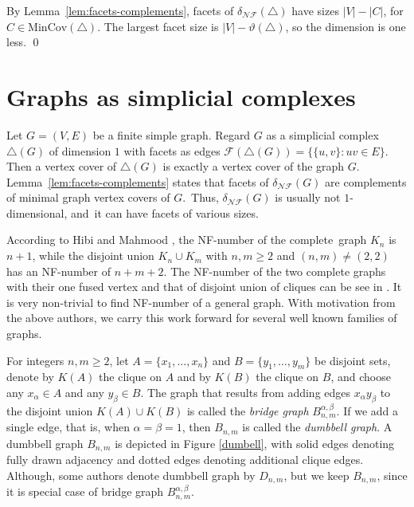 \documentclass[12pt]{article}
\renewenvironment{proof}{{\noindent\bfseries Proof.}}{\qed}
\theoremstyle{plain}
\theoremstyle{definition}
\newcommand{\F}{\mathcal{F}}
\newcommand{\MIN}{\mathrm{MinCov}}
\newcommand{\V}{V}
\newcommand{\A}{A}
\newcommand{\B}{B}
\begin{document}
	\begin{proof}
		By Lemma~\ref{lem:facets-complements}, facets of $\delta_{\mathcal{NF}}(\bigtriangleup)$ have sizes $|\V|-|C|$, for $C\in\MIN(\bigtriangleup)$.
		The largest facet size is $|\V|-\vartheta(\bigtriangleup)$, so the dimension is one less.
	\end{proof}
	
	
	\section{Graphs as simplicial complexes}\label{section 3}
	
	 Let $G=(\V,E)$ be a finite simple graph. Regard $G$ as a simplicial complex $\bigtriangleup(G)$ of dimension $1$ with facets as edges	$\F(\bigtriangleup(G))=\{\{u,v\}:uv\in E\}$.
	Then a vertex cover of $\bigtriangleup(G)$ is exactly a vertex cover of the graph $G$. Lemma~\ref{lem:facets-complements} states that facets of $\delta_{\mathcal{NF}}(G)$ are complements of minimal graph vertex covers of $G$. Thus, $\delta_{\mathcal{NF}}(G)$ is usually not $1$-dimensional, and it can have facets of various sizes. 
	
	\medskip
	 According to Hibi and Mahmood \cite{HibiMahmood2020}, the NF-number of the complete graph $K_n$ is $n+1$, while the disjoint union $K_n\cup K_m$ with $n,m\ge 2$ and $(n,m)\neq(2,2)$ has an NF-number of $n+m+2$. The NF-number of the two complete graphs with their one fused vertex and that of disjoint union of cliques can be see in \cite{bilalhafiz,bilalhafiz1}. It is very non-trivial to find NF-number of a general graph. With motivation from the above authors, we carry this work forward for several well known families of graphs.
	
	 
	\medskip
	  For integers \(n,m\ge 2\), let \(\A=\{x_1,\dots,x_n\}\) and \(\B=\{y_1,\dots,y_m\}\) be disjoint sets, denote by \(K(\A)\) the clique on \(\A\) and by \(K(\B)\) the clique on \(\B\), and choose any \(x_\alpha\in \A\) and any \(y_\beta\in \B\). The graph that results from adding  edges $x_\alpha y_\beta$ to the disjoint union $K(\A)\cup K(\B)$ is called the \emph{bridge graph} $B_{n,m}^{\alpha,\beta}$. If we add a single edge, that is,  when $\alpha=\beta=1$, then $B_{n,m}$ is called the \emph{dumbbell graph}. A dumbbell graph $B_{n,m}$ is depicted in Figure \ref{dumbell}, with solid edges denoting fully drawn adjacency and dotted edges denoting additional clique edges. Although, some authors denote dumbbell graph by $D_{n,m}$, but we keep $ B_{n,m}$, since it is special case of bridge graph $B_{n,m}^{\alpha,\beta}$.
	
\end{document}
